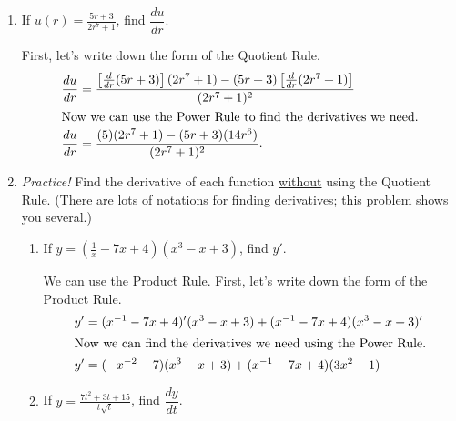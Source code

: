 \documentclass{article}
\begin{document}
\begin{enumerate}[resume, topsep=0pt]
\item 
  \begin{problem}[\vfill]
    If $\displaystyle u(r) = \frac{5r + 3}{2r^7 + 1}$, find $\dfrac{du}{dr}$. 
  \end{problem}

  \begin{solution}
    First, let's write down the form of the Quotient Rule.
    \begin{align*}
        \frac{du}{dr} &= \frac{\left[\frac{d}{dr}(5r + 3)\right](2r^7 + 1)
        - (5r + 3)\left[\frac{d}{dr}(2r^7 + 1)\right]}{(2r^7 + 1)^2}\\
        \intertext{Now we can use the Power Rule to find the derivatives we need.}
       \frac{du}{dr} &= \frac{(5)(2r^7 + 1)
        - (5r + 3)(14r^6)}{(2r^7 + 1)^2}.
    \end{align*}
  \end{solution}

\item  \emph{Practice!} Find the derivative of each function \uline{without} using the Quotient Rule. (There are lots of notations for finding derivatives; this problem shows you several.) 

  \begin{enumerate}
  \item
    \begin{problem}[\vfill]
      If $\displaystyle y = \left( \frac{1}{x} - 7x + 4 \right) (x^3 - x + 3)$, find $y'$. 
    \end{problem}

    \begin{solution}
      We can use the Product Rule. First, let's write down the form of the Product Rule.
      \begin{align*}
        y' &= (x^{-1} - 7x + 4)'(x^3 - x + 3) + (x^{-1} - 7x + 4)(x^3 - x + 3)' \\
        \intertext{Now we can find the derivatives we need using the Power Rule.}
        y' &= (-x^{-2} - 7)(x^3 - x + 3) + (x^{-1} - 7x + 4)(3x^2 - 1)
      \end{align*}
    \end{solution}

  \item
    \begin{problem}[\vfill]
      If $\displaystyle y= \frac{7t^2 + 3t + 15}{t \sqrt{t}}$, find $\dfrac{dy}{dt}$.
    \end{problem}


\end{enumerate}
\end{enumerate}
\end{document}

